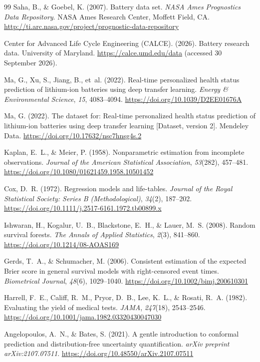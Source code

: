 \documentclass[preprint,12pt]{elsarticle}
\begin{document}
\begin{thebibliography}{99}
Saha, B., \& Goebel, K. (2007). Battery data set. \textit{NASA Ames Prognostics Data Repository}. NASA Ames Research Center, Moffett Field, CA. \url{http://ti.arc.nasa.gov/project/prognostic-data-repository}

Center for Advanced Life Cycle Engineering (CALCE). (2026). Battery research data. University of Maryland. \url{https://calce.umd.edu/data} (accessed 30 September 2026).

Ma, G., Xu, S., Jiang, B., et~al. (2022). Real-time personalized health status prediction of lithium-ion batteries using deep transfer learning. \textit{Energy \& Environmental Science}, \textit{15}, 4083--4094. \url{https://doi.org/10.1039/D2EE01676A}

Ma, G. (2022). The dataset for: Real-time personalized health status prediction of lithium-ion batteries using deep transfer learning [Dataset, version 2]. Mendeley Data. \url{https://doi.org/10.17632/nsc7hnsg4s.2}

Kaplan, E.~L., \& Meier, P. (1958). Nonparametric estimation from incomplete observations. \textit{Journal of the American Statistical Association}, \textit{53}(282), 457--481. \url{https://doi.org/10.1080/01621459.1958.10501452}

Cox, D.~R. (1972). Regression models and life-tables. \textit{Journal of the Royal Statistical Society: Series B (Methodological)}, \textit{34}(2), 187--202. \url{https://doi.org/10.1111/j.2517-6161.1972.tb00899.x}

Ishwaran, H., Kogalur, U.~B., Blackstone, E.~H., \& Lauer, M.~S. (2008). Random survival forests. \textit{The Annals of Applied Statistics}, \textit{2}(3), 841--860. \url{https://doi.org/10.1214/08-AOAS169}

Gerds, T.~A., \& Schumacher, M. (2006). Consistent estimation of the expected Brier score in general survival models with right-censored event times. \textit{Biometrical Journal}, \textit{48}(6), 1029--1040. \url{https://doi.org/10.1002/bimj.200610301}

Harrell, F.~E., Califf, R.~M., Pryor, D.~B., Lee, K.~L., \& Rosati, R.~A. (1982). Evaluating the yield of medical tests. \textit{JAMA}, \textit{247}(18), 2543--2546. \url{https://doi.org/10.1001/jama.1982.03320430047030}

Angelopoulos, A.~N., \& Bates, S. (2021). A gentle introduction to conformal prediction and distribution-free uncertainty quantification. \textit{arXiv preprint arXiv:2107.07511}. \url{https://doi.org/10.48550/arXiv.2107.07511}

\end{thebibliography}
\end{document}

